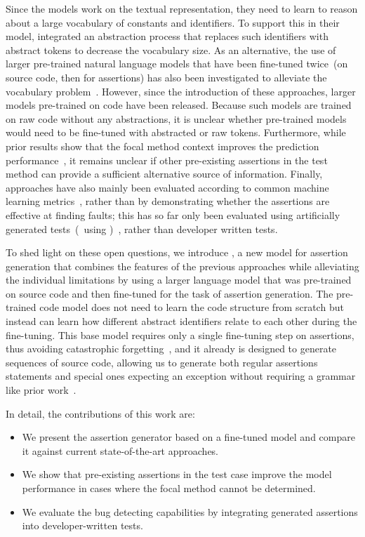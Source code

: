 Since the models work on the textual representation, they need to
learn to reason about a large vocabulary of constants and identifiers.
To support this in their model, \atlas integrated an abstraction
process that replaces such identifiers with abstract tokens to
decrease the vocabulary size. As an alternative, the use of larger
pre-trained natural language models that have been fine-tuned
twice~(on source code, then for assertions) has also been investigated
to alleviate the vocabulary problem~\cite{Tufano2022}.
However, since the introduction of these approaches, larger models
pre-trained on code have been released. Because such models are
trained on raw code without any abstractions, it is unclear whether
pre-trained models would need to be fine-tuned with abstracted or raw
tokens.
Furthermore, while prior results show that the focal method context
improves the prediction performance~\cite{Tufano2022}, it remains
unclear if other pre-existing assertions in the test method can
provide a sufficient alternative source of information.
Finally, approaches have also mainly been evaluated according to
common machine learning
metrics~\cite{Watson2020,Wang2024,Mastropaolo2021}, rather than by
demonstrating whether the assertions are effective at finding faults;
this has so far only been evaluated using artificially generated
tests~(\eg~using \evosuite)~\cite{Tufano2022,Dinella2022}, rather than
developer written tests.


To shed light on these open questions, we introduce \assertfive, a new
model for assertion generation that combines the features of the
previous approaches while alleviating the individual limitations by
using a larger language model that was pre-trained on source code and
then fine-tuned for the task of assertion generation.
The pre-trained code model does not need to learn the code structure
from scratch %
but instead can learn how
different abstract identifiers relate to each other during the
fine-tuning.
This base model requires only a single fine-tuning step on assertions,
thus avoiding catastrophic forgetting~\cite{Bower1989}, and
it already is designed to generate sequences of source code, allowing
us to generate both regular assertions statements and special ones
expecting an exception without requiring a grammar like prior
work~\cite{Dinella2022}.

In detail, the contributions of this work are:
\begin{itemize}
  \item We present the \assertfive assertion generator based on a
    fine-tuned \codetfive model and compare it against current
    state-of-the-art approaches.
  \item We show that pre-existing assertions in the test case improve
    the model performance in cases where the focal method cannot be
    determined.
  \item We evaluate the bug detecting capabilities by integrating
    generated assertions into developer-written tests.
\end{itemize}


